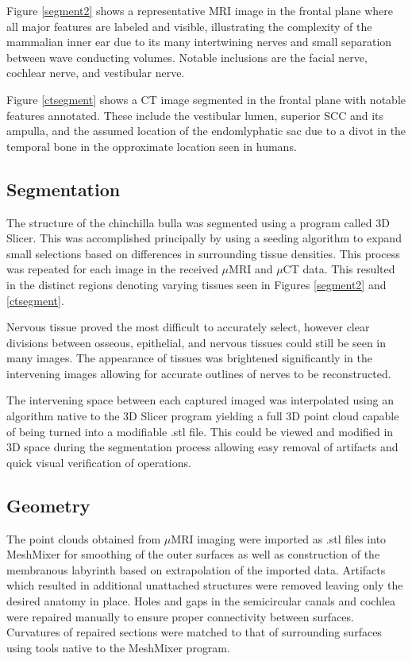 \documentclass[12pt]{article}
\begin{document}
Figure \ref{segment2} shows a representative MRI image in the frontal plane where all major features are labeled and visible, illustrating the complexity of the mammalian inner ear due to its many intertwining nerves and small separation between wave conducting volumes. Notable inclusions are the facial nerve, cochlear nerve, and vestibular nerve.

Figure \ref{ctsegment} shows a CT image segmented in the frontal plane with notable features annotated. These include the vestibular lumen, superior SCC and its ampulla, and the assumed location of the endomlyphatic sac due to a divot in the temporal bone in the opproximate location seen in humans.\cite{ensac}


\subsection{Segmentation}
The structure of the chinchilla bulla was segmented using a program called 3D Slicer. \cite{slicer} This was accomplished principally by using a seeding algorithm to expand small selections based on differences in surrounding tissue densities. This process was repeated for each image in the received $\mu$MRI and $\mu$CT data. This resulted in the distinct regions denoting varying tissues seen in Figures \ref{segment2} and \ref{ctsegment}.

Nervous tissue proved the most difficult to accurately select, however clear divisions between osseous, epithelial, and nervous tissues could still be seen in many images. The appearance of tissues was brightened significantly in the intervening images allowing for accurate outlines of nerves to be reconstructed.

The intervening space between each captured imaged was interpolated using an algorithm native to the 3D Slicer program yielding a full 3D point cloud capable of being turned into a modifiable .stl file. \cite{slicer} This could be viewed and modified in 3D space during the segmentation process allowing easy removal of artifacts and quick visual verification of operations.


\subsection{Geometry}
The point clouds obtained from $\mu$MRI imaging were imported as .stl files into MeshMixer for smoothing of the outer surfaces as well as construction of the membranous labyrinth based on extrapolation of the imported data. Artifacts which resulted in additional unattached structures were removed leaving only the desired anatomy in place. Holes and gaps in the semicircular canals and cochlea were repaired manually to ensure proper connectivity between surfaces. Curvatures of repaired sections were matched to that of surrounding surfaces using tools native to the MeshMixer program.
\end{document}
